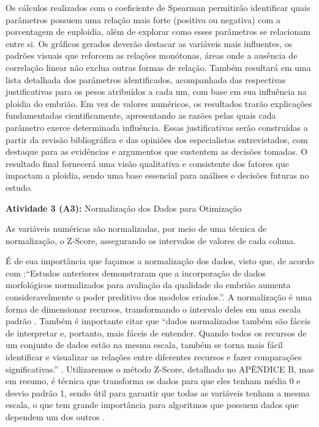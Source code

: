 Os cálculos realizados com o coeficiente de Spearman permitirão identificar quais parâmetros possuem uma relação mais forte (positiva ou negativa) com a porcentagem de euploidia, além de explorar como esses parâmetros se relacionam entre si. Os gráficos gerados deverão destacar as variáveis mais influentes, os padrões visuais que reforcem as relações monótonas, áreas onde a ausência de correlação linear não exclua outras formas de relação. Também resultará em uma lista detalhada dos parâmetros identificados, acompanhada das respectivas justificativas para os pesos atribuídos a cada um, com base em sua influência na ploidia do embrião. Em vez de valores numéricos, os resultados trarão explicações fundamentadas cientificamente, apresentando as razões pelas quais cada parâmetro exerce determinada influência. Essas justificativas serão construídas a partir da revisão bibliográfica e das opiniões dos especialistas entrevistados, com destaque para as evidências e argumentos que sustentem as decisões tomadas. O resultado final fornecerá uma visão qualitativa e consistente dos fatores que impactam a ploidia, sendo uma base essencial para análises e decisões futuras no estudo.

\textbf{Atividade 3 (A3):} Normalização dos Dados para Otimização

As variáveis numéricas são normalizadas, por meio de uma técnica de normalização, o Z-Score, assegurando os intervalos de valores de cada coluna. 

É de sua importância que façamos a normalização dos dados, visto que, de acordo com :“Estudos anteriores demonstraram que a incorporação de dados morfológicos normalizados para avaliação da qualidade do embrião aumenta consideravelmente o poder preditivo dos modelos criados.”. A normalização é uma forma de dimensionar recursos, transformando o intervalo deles em uma escala padrão \cite{jaiswal2024}. Também é importante citar que “dados normalizados também são fáceis de interpretar e, portanto, mais fáceis de entender. Quando todos os recursos de um conjunto de dados estão na mesma escala, também se torna mais fácil identificar e visualizar as relações entre diferentes recursos e fazer comparações significativas.” \cite{jaiswal2024}. Utilizaremos o método Z-Score, detalhado no APÊNDICE B, mas em resumo, é técnica que transforma os dados para que eles tenham média 0 e desvio padrão 1, sendo útil para garantir que todas as variáveis tenham a mesma escala, o que tem grande importância para algoritmos que possuem dados que dependem um dos outros \cite{jaiswal2024}.

